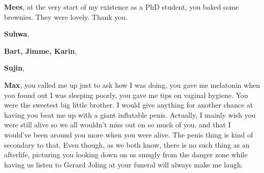 {\bfseries Mees}, at the very start of my existence as a PhD student, you baked some brownies. They were lovely. Thank you.

{\bfseries Suhwa},



{\bfseries Bart, Jimme, Karin},

{\bfseries Sujin},

{\bfseries Max}, you called me up just to ask how I was doing, you gave me melatonin when you found out I was sleeping poorly, you gave me tips on vaginal hygiene. You were the sweetest big little brother. I would give anything for another chance at having you beat me up with a giant inflatable penis. Actually, I mainly wish you were still alive so we all wouldn't miss out on so much of you, and that I would've been around you more when you were alive. The penis thing is kind of secondary to that. Even though, as we both know, there is no such thing as an afterlife, picturing you looking down on us smugly from the danger zone while having us listen to Gerard Joling at your funeral will always make me laugh.
